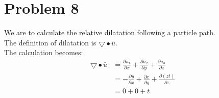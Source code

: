 \documentclass[11pt,a4paper,english]{article}
\numberwithin{equation}{section}
\begin{document}
\section{Problem 8}
We are to calculate the relative dilatation following a particle path. \\
The definition of dilatation is $\bigtriangledown \bullet \bar{u}$.	\\
The calculation becomes:
\begin{align*}
	\bigtriangledown \bullet \bar{u} &= 	
		\frac{\partial u_1}{\partial x} + \frac{\partial u_2}{\partial y} + \frac{\partial u_3}{\partial z}
	\\
	&= -\frac{\partial y}{\partial x} + \frac{\partial x}{\partial y} + \frac{\partial (zt)}{\partial z}
	\\
	&= 0 + 0 + t
\end{align*}
\end{document}
